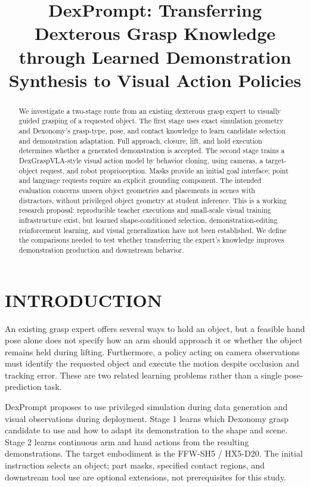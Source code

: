 \documentclass[letterpaper, 10 pt, conference]{ieeeconf}
\title{\LARGE \bf DexPrompt: Transferring Dexterous Grasp Knowledge\\
through Learned Demonstration Synthesis to Visual Action Policies}
\author{}
\begin{document}
\maketitle
\thispagestyle{empty}
\pagestyle{empty}

\begin{abstract}
We investigate a two-stage route from an existing dexterous grasp expert to
visually guided grasping of a requested object. The first stage uses exact
simulation geometry and Dexonomy's grasp-type, pose, and contact knowledge to
learn candidate selection and demonstration adaptation. Full approach, closure,
lift, and hold execution determines whether a generated demonstration is accepted.
The second stage trains a DexGraspVLA-style visual action model by behavior
cloning, using cameras, a target-object request, and robot proprioception.
Masks provide an initial goal interface; point and language requests require
an explicit grounding component. The intended evaluation concerns unseen object
geometries and placements in scenes with distractors, without privileged object
geometry at student inference. This is a working research proposal: reproducible
teacher executions and small-scale visual training infrastructure exist, but
learned shape-conditioned selection, demonstration-editing reinforcement learning,
and visual generalization have not been established. We define the comparisons
needed to test whether transferring the expert's knowledge improves demonstration
production and downstream behavior.
\end{abstract}

\section{INTRODUCTION}
An existing grasp expert offers several ways to hold an object, but a feasible
hand pose alone does not specify how an arm should approach it or whether the
object remains held during lifting. Furthermore, a policy acting on camera
observations must identify the requested object and execute the motion despite
occlusion and tracking error. These are two related learning problems rather
than a single pose-prediction task.

DexPrompt proposes to use privileged simulation during data generation and
visual observations during deployment. Stage 1 learns which Dexonomy grasp
candidate to use and how to adapt its demonstration to the shape and scene.
Stage 2 learns continuous arm and hand actions from the resulting demonstrations.
The target embodiment is the FFW-SH5 / HX5-D20. The initial instruction selects
an object; part masks, specified contact regions, and downstream tool use are
optional extensions, not prerequisites for this study.
\end{document}
